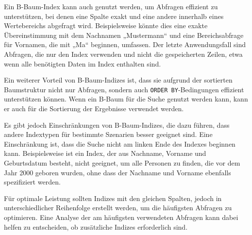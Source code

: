 Ein B-Baum-Index kann auch genutzt werden, um Abfragen effizient zu unterstützen, bei denen eine Spalte exakt und eine andere innerhalb eines Wertebereichs abgefragt wird.
Beispielsweise könnte dies eine exakte Übereinstimmung mit dem Nachnamen „Mustermann“ und eine Bereichsabfrage für Vornamen, die mit „Ma“ beginnen, umfassen.
Der letzte Anwendungsfall sind Abfragen, die nur den Index verwenden und nicht die gespeicherten Zeilen, etwa wenn alle benötigten Daten im Index enthalten sind.

Ein weiterer Vorteil von B-Baum-Indizes ist, dass sie aufgrund der sortierten Baumstruktur nicht nur Abfragen, sondern auch \texttt{ORDER BY}-Bedingungen effizient unterstützen können.
Wenn ein B-Baum für die Suche genutzt werden kann, kann er auch für die Sortierung der Ergebnisse verwendet werden.

Es gibt jedoch Einschränkungen von B-Baum-Indizes, die dazu führen, dass andere Indextypen für bestimmte Szenarien besser geeignet sind.
Eine Einschränkung ist, dass die Suche nicht am linken Ende des Indexes beginnen kann.
Beispielsweise ist ein Index, der aus Nachname, Vorname und Geburtsdatum besteht, nicht geeignet, um alle Personen zu finden, die vor dem Jahr 2000 geboren wurden, ohne dass der Nachname und Vorname ebenfalls spezifiziert werden.

Für optimale Leistung sollten Indizes mit den gleichen Spalten, jedoch in unterschiedlicher Reihenfolge erstellt werden, um die häufigsten Abfragen zu optimieren.
Eine Analyse der am häufigsten verwendeten Abfragen kann dabei helfen zu entscheiden, ob zusätzliche Indizes erforderlich sind.
